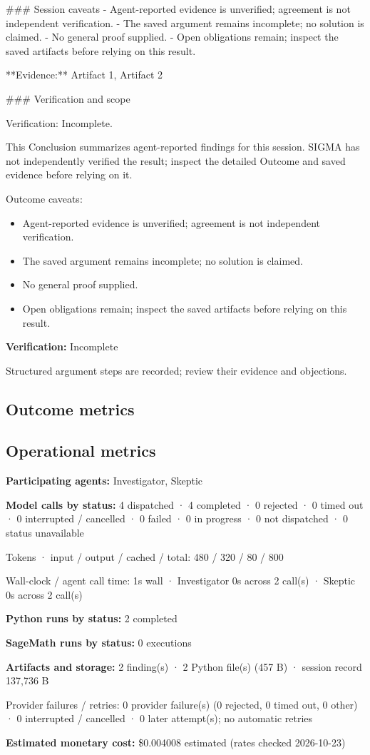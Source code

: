 \documentclass[11pt]{article}
\begin{document}
\#\#\# Session caveats
- Agent-reported evidence is unverified; agreement is not independent verification.
- The saved argument remains incomplete; no solution is claimed.
- No general proof supplied.
- Open obligations remain; inspect the saved artifacts before relying on this result.

**Evidence:** Artifact 1, Artifact 2

\#\#\# Verification and scope

Verification: Incomplete.

This Conclusion summarizes agent-reported findings for this session. SIGMA has not independently verified the result; inspect the detailed Outcome and saved evidence before relying on it.\par
Outcome caveats:\par
\begin{itemize}
\item Agent-reported evidence is unverified; agreement is not independent verification.
\item The saved argument remains incomplete; no solution is claimed.
\item No general proof supplied.
\item Open obligations remain; inspect the saved artifacts before relying on this result.
\end{itemize}
\textbf{Verification:} Incomplete\par
Structured argument steps are recorded; review their evidence and objections.\par
\subsection{Outcome metrics}
\subsection{Operational metrics}
\textbf{Participating agents:} Investigator, Skeptic\par
\textbf{Model calls by status:} 4 dispatched · 4 completed · 0 rejected · 0 timed out · 0 interrupted / cancelled · 0 failed · 0 in progress · 0 not dispatched · 0 status unavailable\par
Tokens · input / output / cached / total: 480 / 320 / 80 / 800\par
Wall-clock / agent call time: 1s wall · Investigator 0s across 2 call(s) · Skeptic 0s across 2 call(s)\par
\textbf{Python runs by status:} 2 completed\par
\textbf{SageMath runs by status:} 0 executions\par
\textbf{Artifacts and storage:} 2 finding(s) · 2 Python file(s) (457 B) · session record 137,736 B\par
Provider failures / retries: 0 provider failure(s) (0 rejected, 0 timed out, 0 other) · 0 interrupted / cancelled · 0 later attempt(s); no automatic retries\par
\textbf{Estimated monetary cost:} \$0.004008 estimated (rates checked 2026-10-23)\par
\end{document}
